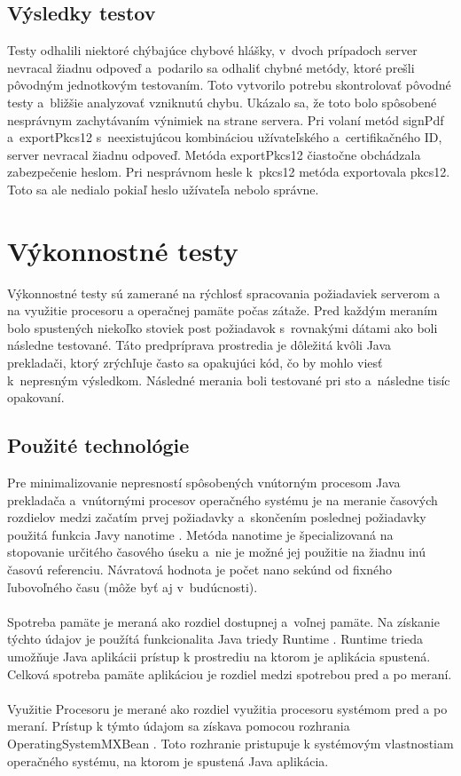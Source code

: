 \documentclass[
  printed, %
  table,   %
oneside,
  nolof,     %
  nolot,     %
]{fithesis3}
\begin{document}
\subsection{Výsledky testov}
Testy odhalili niektoré chýbajúce chybové hlášky, v~dvoch prípadoch server nevracal žiadnu odpoveď a~podarilo sa odhaliť chybné metódy, ktoré prešli pôvodným jednotkovým testovaním.
Toto vytvorilo potrebu skontrolovať pôvodné testy a~bližšie analyzovať vzniknutú chybu. Ukázalo sa, že toto bolo spôsobené nesprávnym zachytávaním výnimiek na strane servera.
Pri volaní metód signPdf a~exportPkcs12 s~neexistujúcou kombináciou užívateľského a~certifikačného ID, server nevracal žiadnu odpoveď. Metóda exportPkcs12 čiastočne obchádzala zabezpečenie heslom. Pri nesprávnom hesle k~pkcs12 metóda exportovala pkcs12. Toto sa ale nedialo pokiaľ heslo užívateľa nebolo správne.
\section{Výkonnostné testy}
Výkonnostné testy sú zamerané na rýchlosť spracovania požiadaviek serverom a na využitie procesoru a operačnej pamäte počas zátaže.
Pred každým meraním bolo spustených niekoľko stoviek post požiadavok s~rovnakými dátami ako boli následne testované. Táto predpríprava prostredia je dôležitá kvôli Java prekladači, ktorý zrýchľuje často sa opakujúci kód, čo by mohlo viesť k~nepresným výsledkom. Následné merania boli  testované pri sto a~následne tisíc opakovaní.
\subsection{Použité technológie}
Pre minimalizovanie nepresností spôsobených vnútorným procesom Java prekladača a~vnútornými procesov operačného systému je na meranie časových rozdielov medzi začatím prvej požiadavky a~skončením poslednej požiadavky použitá funkcia Javy nanotime \cite{systemNanotime}. Metóda nanotime je špecializovaná na stopovanie určitého časového úseku a~nie je možné jej použitie na žiadnu inú časovú referenciu. Návratová hodnota je počet nano sekúnd od fixného ľubovoľného času (môže byť aj v~budúcnosti).
\paragraph{}
Spotreba pamäte je meraná ako rozdiel dostupnej a~voľnej pamäte. Na získanie týchto údajov je použítá funkcionalita Java triedy Runtime \cite{runtime}. Runtime trieda umožňuje Java aplikácii prístup k prostrediu na ktorom je aplikácia spustená. Celková spotreba pamäte aplikáciou je rozdiel medzi spotrebou pred a po meraní. \paragraph{}
Využitie Procesoru je merané ako rozdiel využitia procesoru systémom pred a po meraní. Prístup k týmto údajom sa získava pomocou rozhrania OperatingSystemMXBean \cite{mxBean}. Toto rozhranie pristupuje k systémovým vlastnostiam operačného systému, na ktorom je spustená Java aplikácia.  
\end{document}
